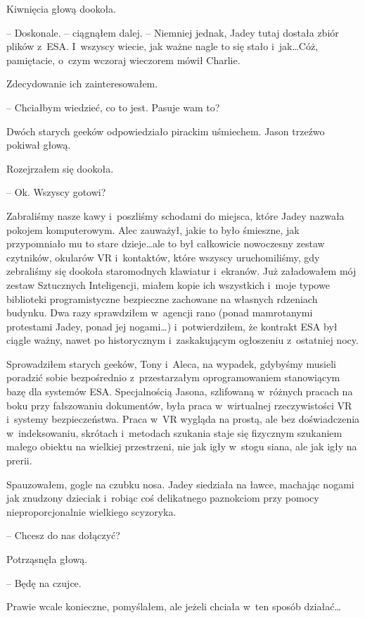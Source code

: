 \documentclass[oneside,polish,12pt,sfheadings]{mwbk}
\begin{document}
Kiwnięcia głową dookoła.

-- Doskonale. -- ciągnąłem dalej. -- Niemniej jednak, Jadey tutaj dostała
zbiór plików z~ESA. I~wszyscy wiecie, jak ważne nagle to się stało i~jak\ldots Cóż, pamiętacie, o~czym wczoraj wieczorem mówił Charlie.

Zdecydowanie ich zainteresowałem.

-- Chciałbym wiedzieć, co to jest. Pasuje wam to?

Dwóch starych geeków odpowiedziało pirackim uśmiechem. Jason trzeźwo
pokiwał głową.

Rozejrzałem się dookoła. 

-- Ok. Wszyscy gotowi?

Zabraliśmy nasze kawy i~poszliśmy schodami do miejsca, które Jadey
nazwała pokojem komputerowym. Alec zauważył, jakie to było śmieszne, jak
przypomniało mu to stare dzieje\ldots ale to był całkowicie nowoczesny
zestaw czytników, okularów VR i~kontaktów, które wszyscy uruchomiliśmy,
gdy zebraliśmy się dookoła staromodnych klawiatur i~ekranów. Już
załadowałem mój zestaw Sztucznych Inteligencji, miałem kopie ich
wszystkich i~moje typowe biblioteki programistyczne bezpieczne zachowane
na własnych rdzeniach budynku. Dwa razy sprawdziłem w~agencji rano
(ponad mamrotanymi protestami Jadey, ponad jej nogami\ldots) i~potwierdziłem, że kontrakt ESA był ciągle ważny, nawet po historycznym i~zaskakującym ogłoszeniu z~ostatniej nocy.

Sprowadziłem starych geeków, Tony i~Aleca, na wypadek, gdybyśmy musieli
poradzić sobie bezpośrednio z~przestarzałym oprogramowaniem stanowiącym
bazę dla systemów ESA. Specjalnością Jasona, szlifowaną w~różnych
pracach na boku przy fałszowaniu dokumentów, była praca w~wirtualnej
rzeczywistości VR i~systemy bezpieczeństwa. Praca w~VR wygląda na
prostą, ale bez doświadczenia w~indeksowaniu, skrótach i~metodach
szukania staje się fizycznym szukaniem małego obiektu na wielkiej
przestrzeni, nie jak igły w~stogu siana, ale jak igły na prerii.

Spauzowałem, gogle na czubku nosa. Jadey siedziała na ławce, machając
nogami jak znudzony dzieciak i~robiąc coś delikatnego paznokciom przy
pomocy nieproporcjonalnie wielkiego scyzoryka.

-- Chcesz do nas dołączyć?

Potrząsnęła głową. 

-- Będę na czujce.

Prawie wcale konieczne, pomyślałem, ale jeżeli chciała w~ten sposób
działać\ldots
\end{document}
